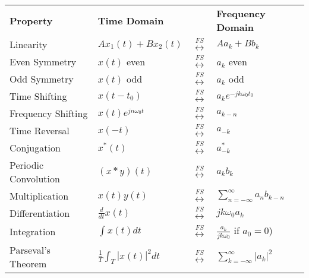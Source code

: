 \documentclass[8pt]{article}
\begin{document}
\begin{table}[ht]
    \centering
    \label{tab:ctfourier_properties}
    \begin{tabular}{llll}
        \textbf{Property}    & \textbf{Time Domain}             &                                 & \textbf{Frequency Domain}                 \\
        Linearity            & $A x_1(t) + B x_2(t)$            & $\overset{FS}{\leftrightarrow}$ & $A a_k + B b_k$                           \\
        Even Symmetry        & $x(t)$ even                      & $\overset{FS}{\leftrightarrow}$ & $a_k$ even                                \\
        Odd Symmetry         & $x(t)$ odd                       & $\overset{FS}{\leftrightarrow}$ & $a_k$ odd                                 \\
        Time Shifting        & $x(t - t_0)$                     & $\overset{FS}{\leftrightarrow}$ & $a_k e^{-j k \omega_0 t_0}$               \\
        Frequency Shifting   & $x(t) e^{j n \omega_0 t}$        & $\overset{FS}{\leftrightarrow}$ & $a_{k - n}$                               \\
        Time Reversal        & $x(-t)$                          & $\overset{FS}{\leftrightarrow}$ & $a_{-k}$                                  \\
        Conjugation          & $x^*(t)$                         & $\overset{FS}{\leftrightarrow}$ & $a_{-k}^*$                                \\
        Periodic Convolution & $(x \ast y)(t)$                  & $\overset{FS}{\leftrightarrow}$ & $a_k b_k$                                 \\
        Multiplication       & $x(t) y(t)$                      & $\overset{FS}{\leftrightarrow}$ & $\sum_{n=-\infty}^{\infty} a_n b_{k - n}$ \\
        Differentiation      & $\frac{d}{dt} x(t)$              & $\overset{FS}{\leftrightarrow}$ & $j k \omega_0 a_k$                        \\
        Integration          & $\int x(t) dt$                   & $\overset{FS}{\leftrightarrow}$ & $\frac{a_k}{j k \omega_0}$ if $a_0 = 0$)  \\
        Parseval's Theorem   & $\frac{1}{T} \int_T |x(t)|^2 dt$ & $\overset{FS}{\leftrightarrow}$ & $\sum_{k=-\infty}^{\infty} |a_k|^2$       \\
    \end{tabular}
\end{table}
\end{document}
